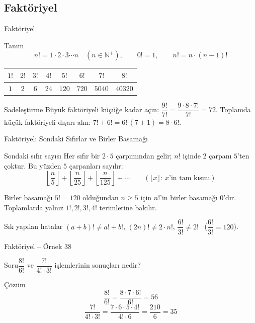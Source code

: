 \documentclass[aspectratio=169,11pt,handout]{beamer}
\newcommand{\soru}[3]{%
\begin{frame}{#1}
  \begin{block}{Soru}\large #2\end{block}
  \pause
  \begin{exampleblock}{Çözüm}\large #3\end{exampleblock}
\end{frame}}
\begin{document}
\subsection{Faktöriyel}
\begin{frame}{Faktöriyel}
\begin{block}{Tanım}
\[n!=1\cdot 2\cdot 3\cdots n\quad(n\in\mathbb{N}^{+}),\qquad 0!=1,\qquad n!=n\cdot(n-1)!\]
\centering
\begin{tabular}{cccccccc}
\toprule
\(1!\) & \(2!\) & \(3!\) & \(4!\) & \(5!\) & \(6!\) & \(7!\) & \(8!\)\\\midrule
\(1\) & \(2\) & \(6\) & \(24\) & \(120\) & \(720\) & \(5040\) & \(40320\)\\\bottomrule
\end{tabular}
\end{block}
\begin{block}{Sadeleştirme}
Büyük faktöriyeli küçüğe kadar açın: \(\dfrac{9!}{7!}=\dfrac{9\cdot 8\cdot 7!}{7!}=72\). \quad Toplamda küçük faktöriyeli dışarı alın: \(7!+6!=6!\,(7+1)=8\cdot 6!\).
\end{block}
\end{frame}

\begin{frame}{Faktöriyel: Sondaki Sıfırlar ve Birler Basamağı}
\begin{block}{Sondaki sıfır sayısı}
Her sıfır bir \(2\cdot 5\) çarpımından gelir; \(n!\) içinde \(2\) çarpanı \(5\)'ten çoktur. Bu yüzden \(5\) çarpanları sayılır:
\[\left\lfloor\frac{n}{5}\right\rfloor+\left\lfloor\frac{n}{25}\right\rfloor+\left\lfloor\frac{n}{125}\right\rfloor+\cdots\qquad(\lfloor x\rfloor:\ x\text{'in tam kısmı})\]
\end{block}
\begin{block}{Birler basamağı}
\(5!=120\) olduğundan \(n\ge 5\) için \(n!\)'in birler basamağı \(0\)'dır. Toplamlarda yalnız \(1!,2!,3!,4!\) terimlerine bakılır.
\end{block}
\begin{alertblock}{Sık yapılan hatalar}
\((a+b)!\neq a!+b!\), \quad \((2n)!\neq 2\cdot n!\), \quad \(\dfrac{6!}{3!}\neq 2!\) \ (\(\dfrac{6!}{3!}=120\)).
\end{alertblock}
\end{frame}

\soru{Faktöriyel -- Örnek 38}
{\(\dfrac{8!}{6!}\) ve \(\dfrac{7!}{4!\cdot 3!}\) işlemlerinin sonuçları nedir?}
{\[\frac{8!}{6!}=\frac{8\cdot 7\cdot 6!}{6!}=56\]
\[\frac{7!}{4!\cdot 3!}=\frac{7\cdot 6\cdot 5\cdot 4!}{4!\cdot 6}=\frac{210}{6}=35\]}
\end{document}
